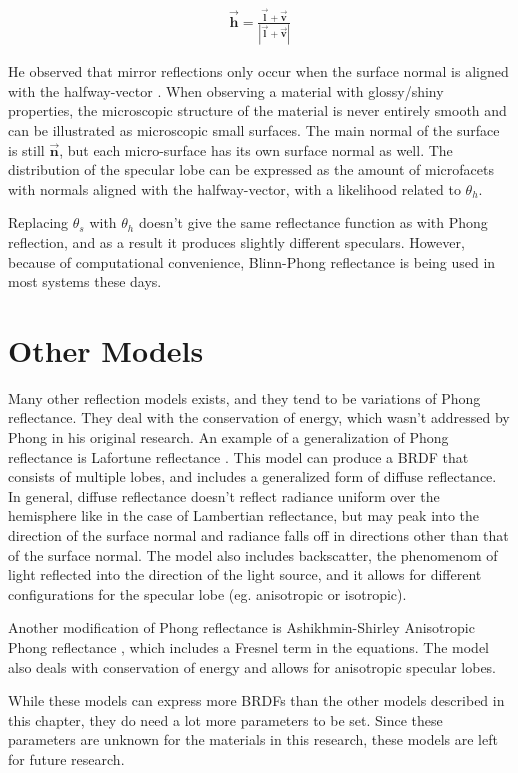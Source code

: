 	\begin{eqnarray*}
		\vec{\mathbf{h}} = \frac{\vec{\mathbf{l}} + \vec{\mathbf{v}}}{|\vec{\mathbf{l}} + \vec{\mathbf{v}}|}
	\end{eqnarray*}

He observed that mirror reflections only occur when the surface normal is aligned with the halfway-vector \cite{DigitalModeling}. When observing a material with glossy/shiny properties, the microscopic structure of the material is never entirely smooth and can be illustrated as microscopic small surfaces. The main normal of the surface is still $\vec{\mathbf{n}}$, but each micro-surface has its own surface normal as well. The distribution of the specular lobe can be expressed as the amount of microfacets with normals aligned with the halfway-vector, with a likelihood related to $\theta_h$.

Replacing $\theta_s$ with $\theta_h$ doesn't give the same reflectance function as with Phong reflection, and as a result it produces slightly different speculars. However, because of computational convenience, Blinn-Phong reflectance is being used in most systems these days.

	\section{Other Models}\label{sec:Other}
		Many other reflection models exists, and they tend to be variations of Phong reflectance. They deal with the conservation of energy, which wasn't addressed by Phong in his original research. An example of a generalization of Phong reflectance is Lafortune reflectance \cite{Lafortune}. This model can produce a BRDF that consists of multiple lobes, and includes a generalized form of diffuse reflectance. In general, diffuse reflectance doesn't reflect radiance uniform over the hemisphere like in the case of Lambertian reflectance, but may peak into the direction of the surface normal and radiance falls off in directions other than that of the surface normal. The model also includes backscatter, the phenomenom of light reflected into the direction of the light source, and it allows for different configurations for the specular lobe (eg. anisotropic or isotropic).

Another modification of Phong reflectance is Ashikhmin-Shirley Anisotropic Phong reflectance \cite{AshikhminShirley}, which includes a Fresnel term in the equations. The model also deals with conservation of energy and allows for anisotropic specular lobes.

While these models can express more BRDFs than the other models described in this chapter, they do need a lot more parameters to be set. Since these parameters are unknown for the materials in this research, these models are left for future research.
